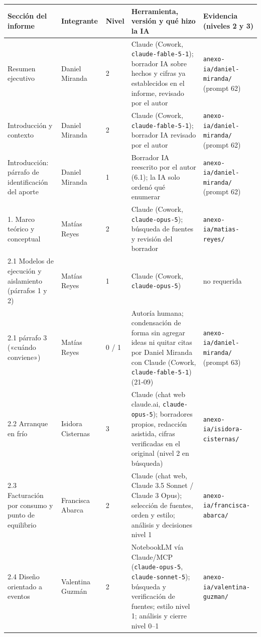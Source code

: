 \documentclass[12pt, letterpaper, table, xcdraw]{inf-pucv}
\begin{document}
{\scriptsize
\begin{longtable}{|p{4.2cm}|p{2.2cm}|p{0.9cm}|p{4.2cm}|p{2.4cm}|}
    \hline
    \textbf{Sección del informe} & \textbf{Integrante} & \textbf{Nivel} & \textbf{Herramienta, versión y qué hizo la IA} & \textbf{Evidencia (niveles 2 y 3)} \\
    \hline
    \endhead
    Resumen ejecutivo & Daniel Miranda & 2 & Claude (Cowork, \texttt{claude-fable-5-1}); borrador IA sobre hechos y cifras ya establecidos en el informe, revisado por el autor & \texttt{anexo-ia/daniel-miranda/} (prompt 62) \\ \hline
    Introducción y contexto & Daniel Miranda & 2 & Claude (Cowork, \texttt{claude-fable-5-1}); borrador IA revisado por el autor & \texttt{anexo-ia/daniel-miranda/} (prompt 62) \\ \hline
    Introducción: párrafo de identificación del aporte & Daniel Miranda & 1 & Borrador IA reescrito por el autor (6.1); la IA solo ordenó qué enumerar & \texttt{anexo-ia/daniel-miranda/} (prompt 62) \\ \hline
    1. Marco teórico y conceptual & Matías Reyes & 2 & Claude (Cowork, \texttt{claude-opus-5}); búsqueda de fuentes y revisión del borrador & \texttt{anexo-ia/matias-reyes/} \\ \hline
    2.1 Modelos de ejecución y aislamiento (párrafos 1 y 2) & Matías Reyes & 1 & Claude (Cowork, \texttt{claude-opus-5}) & no requerida \\ \hline
    2.1 párrafo 3 («cuándo conviene») & Matías Reyes & 0 / 1 & Autoría humana; condensación de forma sin agregar ideas ni quitar citas por Daniel Miranda con Claude (Cowork, \texttt{claude-fable-5-1}) (21-09) & \texttt{anexo-ia/daniel-miranda/} (prompt 63) \\ \hline
    2.2 Arranque en frío & Isidora Cisternas & 3 & Claude (chat web claude.ai, \texttt{claude-opus-5}); borradores propios, redacción asistida, cifras verificadas en el original (nivel 2 en búsqueda) & \texttt{anexo-ia/isidora-cisternas/} \\ \hline
    2.3 Facturación por consumo y punto de equilibrio & Francisca Abarca & 2 & Claude (chat web, Claude 3.5 Sonnet / Claude 3 Opus); selección de fuentes, orden y estilo; análisis y decisiones nivel 1 & \texttt{anexo-ia/francisca-abarca/} \\ \hline
    2.4 Diseño orientado a eventos & Valentina Guzmán & 2 & NotebookLM vía Claude/MCP (\texttt{claude-opus-5}, \texttt{claude-sonnet-5}); búsqueda y verificación de fuentes; estilo nivel 1; análisis y cierre nivel 0--1 & \texttt{anexo-ia/valentina-guzman/} \\ \hline

\end{longtable}}
\end{document}

